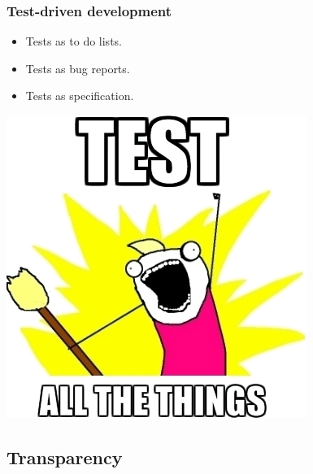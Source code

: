 \documentclass[12pt,compress,english,utf8,t]{beamer}
\begin{document}
\begin{frame}\frametitle{Test-driven development}
  \begin{itemize}
    \item Tests as to do lists.
    \item Tests as bug reports.
    \item Tests as specification.
  \end{itemize}

  \begin{center}
    \includegraphics[scale=0.5]{images/test-all-the-things.jpeg}
  \end{center}
\end{frame}


\subsection{Transparency}
\end{document}
